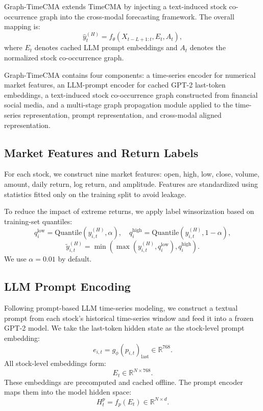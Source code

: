 Graph-TimeCMA extends TimeCMA by injecting a text-induced stock co-occurrence graph into the cross-modal forecasting framework. The overall mapping is:
\begin{equation}
\hat{y}^{(H)}_t = f_\theta(X_{t-L+1:t}, E_t, A_t),
\end{equation}
where $E_t$ denotes cached LLM prompt embeddings and $A_t$ denotes the normalized stock co-occurrence graph.

Graph-TimeCMA contains four components: a time-series encoder for numerical market features, an LLM-prompt encoder for cached GPT-2 last-token embeddings, a text-induced stock co-occurrence graph constructed from financial social media, and a multi-stage graph propagation module applied to the time-series representation, prompt representation, and cross-modal aligned representation.

\subsection{Market Features and Return Labels}

For each stock, we construct nine market features: open, high, low, close, volume, amount, daily return, log return, and amplitude. Features are standardized using statistics fitted only on the training split to avoid leakage.

To reduce the impact of extreme returns, we apply label winsorization based on training-set quantiles:
\begin{equation}
q_i^{\text{low}} = \text{Quantile}(y^{(H)}_{i,t}, \alpha), \quad
q_i^{\text{high}} = \text{Quantile}(y^{(H)}_{i,t}, 1-\alpha),
\end{equation}
\begin{equation}
\tilde{y}^{(H)}_{i,t} = \min \left( \max \left(y^{(H)}_{i,t}, q_i^{\text{low}}\right), q_i^{\text{high}} \right).
\end{equation}
We use $\alpha = 0.01$ by default.

\subsection{LLM Prompt Encoding}

Following prompt-based LLM time-series modeling, we construct a textual prompt from each stock's historical time-series window and feed it into a frozen GPT-2 model. We take the last-token hidden state as the stock-level prompt embedding:
\begin{equation}
e_{i,t} = g_\phi(p_{i,t})_{\text{last}} \in \mathbb{R}^{768}.
\end{equation}
All stock-level embeddings form:
\begin{equation}
E_t \in \mathbb{R}^{N \times 768}.
\end{equation}
These embeddings are precomputed and cached offline. The prompt encoder maps them into the model hidden space:
\begin{equation}
H_t^{p} = f_p(E_t) \in \mathbb{R}^{N \times d}.
\end{equation}

